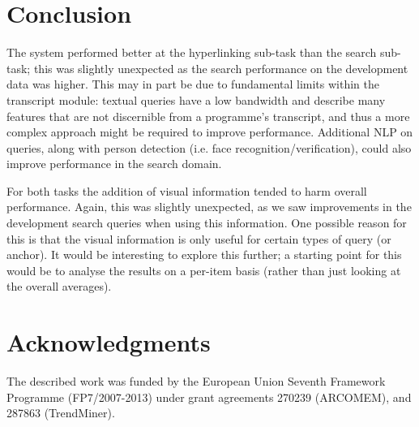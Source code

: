 \documentclass{../acm_proc_article-me11_tweaked}
\begin{document}
\section{Conclusion}
The system performed better at the hyperlinking 
sub-task than the search sub-task; this was slightly unexpected as the search performance on the development data was higher. This may in part be due to fundamental limits within the transcript module: textual queries have a low bandwidth and describe many features that are not discernible from a 
programme's transcript, and thus a more complex approach might be required to improve 
performance. Additional NLP on queries, along with person detection (i.e. face recognition/verification), could also improve performance in the search domain. 

For both tasks the addition of visual information tended to harm overall performance. Again, this was slightly unexpected, as we saw improvements in the development search queries when using this information. One possible reason for this is that the visual information is only useful for certain types of query (or anchor). It would be interesting to explore this further; a starting point for this would be to analyse the results on a per-item basis (rather than just looking at the overall averages).

\section{Acknowledgments}
The described work was funded by the European Union Seventh Framework Programme (FP7/2007-2013) under grant agreements 270239 (ARCOMEM), and 287863 (TrendMiner).



\end{document}
